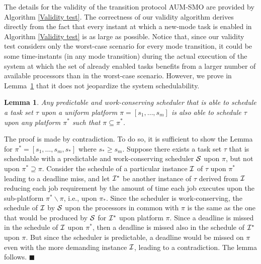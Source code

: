 \documentclass[10pt,english,a4paper]{article}
\newtheorem{lemma}{Lemma}
\newenvironment{proof}[1][Proof]{\begin{trivlist}
\item[\hskip \labelsep {\bfseries #1}]}{\end{trivlist}}
\newtheorem{validity test}{Validity Test}
\newcommand{\fin}{\hfill{\small $\blacksquare$}}     \newcommand{\oh}[1]{\ensuremath{\mathcal{0}{(#1)}}} \def\thefootnote{\arabic{footnote}}
\begin{document}
The details for the validity of the transition protocol AUM-SMO are provided by Algorithm \ref{Validity test}. The correctness of our validity algorithm derives directly from the fact that every instant at which a new-mode task is enabled in Algorithm \ref{Validity test} is as large as possible. Notice that, since our validity test considers only the worst-case scenario for every mode transition, it could be some time-instants (in any mode transition) during the actual execution of the system at which the set of already enabled tasks benefits from a larger number of available processors than in the worst-case scenario. However, we prove in Lemma~\ref{no-anomalies} that it does not jeopardize the system schedulability.

\begin{lemma}\label{no-anomalies}
Any predictable and work-conserving scheduler that is able to schedule a task set $\tau$ upon a uniform platform $\pi = [s_1, \ldots, s_m]$ is also able to schedule $\tau$ upon any platform $\pi^{*}$ such that $\pi \subseteq \pi^{*}$.
\end{lemma}

\begin{proof}
The proof is made by contradiction. To do so, it is sufficient to show the Lemma for $\pi^{*} = [s_1, \ldots, s_m, s_{*}]$ where $s_{*} \ge s_m$. Suppose there exists a task set $\tau$ that is schedulable with a predictable and work-conserving scheduler ${\cal S}$ upon $\pi$, but not upon $\pi^{*} \supseteq \pi$. Consider the schedule of a particular instance ${\cal I}$ of $\tau$ upon $\pi^{*}$ leading to a deadline miss, and let ${\cal I^{*}}$ be another instance of $\tau$ derived from ${\cal I}$ reducing each job requirement by the amount of time each job executes upon the sub-platform $\pi^{*} \backslash \pi$, i.e., upon $\pi_{*}$. Since the scheduler is work-conserving, the schedule of ${\cal I}$ by ${\cal S}$ upon the processors in common with $\pi$ is the same as the one that would be produced by ${\cal S}$ for ${\cal I^{*}}$ upon platform $\pi$. Since a deadline is missed in the schedule of ${\cal I}$ upon $\pi^{*}$, then a deadline is missed also in the schedule of ${\cal I^{*}}$ upon $\pi$. But since the scheduler is predictable, a deadline would be missed on $\pi$ even with the more demanding instance ${\cal I}$, leading to a contradiction. The lemma follows. \fin
\end{proof}
\end{document}
